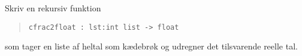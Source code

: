Skriv en rekursiv funktion
  \begin{quote}
    \lstinline{cfrac2float : lst:int list -> float}
  \end{quote}
  som tager en liste af heltal som kædebrøk og udregner det tilsvarende reelle tal.
